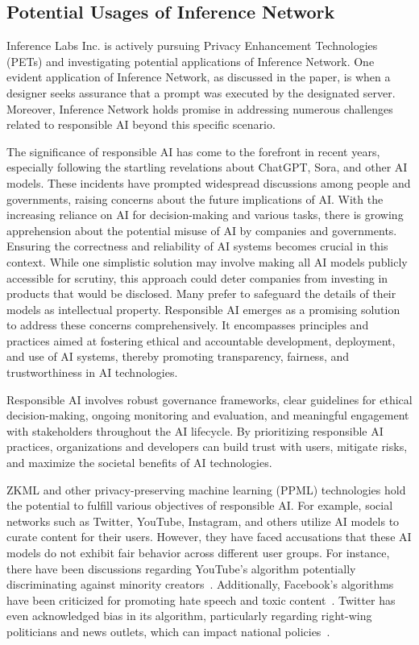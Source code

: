 \documentclass[conference]{IEEEtran}
\begin{document}
\subsection{Potential Usages of Inference Network}

Inference Labs Inc. is actively pursuing Privacy Enhancement Technologies (PETs) and investigating potential applications of Inference Network. One evident application of Inference Network, as discussed in the paper, is when a designer seeks assurance that a prompt was executed by the designated server. Moreover, Inference Network holds promise in addressing numerous challenges related to responsible AI beyond this specific scenario.

The significance of responsible AI has come to the forefront in recent years, especially following the startling revelations about ChatGPT, Sora, and other AI models. These incidents have prompted widespread discussions among people and governments, raising concerns about the future implications of AI. With the increasing reliance on AI for decision-making and various tasks, there is growing apprehension about the potential misuse of AI by companies and governments. Ensuring the correctness and reliability of AI systems becomes crucial in this context. While one simplistic solution may involve making all AI models publicly accessible for scrutiny, this approach could deter companies from investing in products that would be disclosed. Many prefer to safeguard the details of their models as intellectual property. Responsible AI emerges as a promising solution to address these concerns comprehensively. It encompasses principles and practices aimed at fostering ethical and accountable development, deployment, and use of AI systems, thereby promoting transparency, fairness, and trustworthiness in AI technologies.

Responsible AI involves robust governance frameworks, clear guidelines for ethical decision-making, ongoing monitoring and evaluation, and meaningful engagement with stakeholders throughout the AI lifecycle. By prioritizing responsible AI practices, organizations and developers can build trust with users, mitigate risks, and maximize the societal benefits of AI technologies.

ZKML and other privacy-preserving machine learning (PPML) technologies hold the potential to fulfill various objectives of responsible AI. For example, social networks such as Twitter, YouTube, Instagram, and others utilize AI models to curate content for their users. However, they have faced accusations that these AI models do not exhibit fair behavior across different user groups. For instance, there have been discussions regarding YouTube's algorithm potentially discriminating against minority creators~\cite{YoutubeAlgorithmHackernoon}. Additionally, Facebook's algorithms have been criticized for promoting hate speech and toxic content~\cite{FacebookAlgorithmPeoplesDispatch}. Twitter has even acknowledged bias in its algorithm, particularly regarding right-wing politicians and news outlets, which can impact national policies~\cite{TwitterBiasTheGuardian}.
\end{document}
